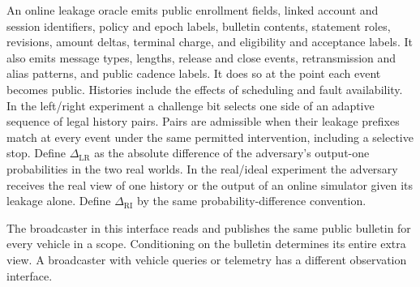 \begin{definition}
\label{def:privacy}
An online leakage oracle emits public enrollment fields, linked account and session identifiers, policy and epoch labels, bulletin contents, statement roles, revisions, amount deltas, terminal charge, and eligibility and acceptance labels. It also emits message types, lengths, release and close events, retransmission and alias patterns, and public cadence labels. It does so at the point each event becomes public. Histories include the effects of scheduling and fault availability.
In the left/right experiment a challenge bit selects one side of an adaptive sequence of legal history pairs. Pairs are admissible when their leakage prefixes match at every event under the same permitted intervention, including a selective stop. Define $\Delta_{\mathrm{LR}}$ as the absolute difference of the adversary's output-one probabilities in the two real worlds. In the real/ideal experiment the adversary receives the real view of one history or the output of an online simulator given its leakage alone. Define $\Delta_{\mathrm{RI}}$ by the same probability-difference convention.
\end{definition}

The broadcaster in this interface reads and publishes the same public bulletin for every vehicle in a scope. Conditioning on the bulletin determines its entire extra view. A broadcaster with vehicle queries or telemetry has a different observation interface.
